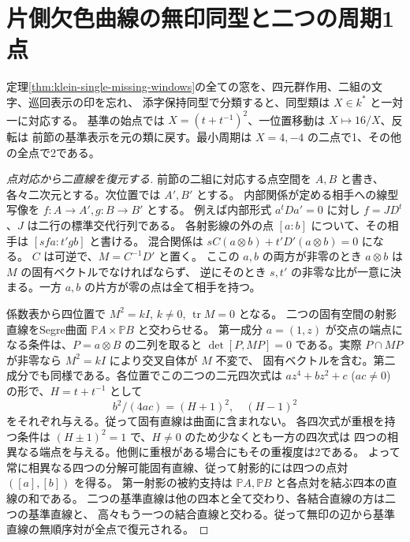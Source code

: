 \section{片側欠色曲線の無印同型と二つの周期1点}
\label{sec:single-missing-curve-isomorphism}
\begin{theorem}\label{thm:single-missing-curve-isomorphism}
定理\ref{thm:klein-single-missing-windows}の全ての窓を、四元群作用、二組の文字、巡回表示の印を忘れ、
添字保持同型で分類すると、同型類は $X\in k^*$ と一対一に対応する。
基準の始点では $X=(t+t^{-1})^2$、一位置移動は $X\mapsto16/X$、反転は
前節の基準表示を元の類に戻す。最小周期は $X=4,-4$ の二点で1、その他の全点で2である。
\end{theorem}
\begin{proof}[点対応から二直線を復元する]
前節の二組に対応する点空間を $A,B$ と書き、各々二次元とする。次位置では $A',B'$ とする。
内部関係が定める相手への線型写像を $f:A\to A',g:B\to B'$ とする。
例えば内部形式 $a^t D a'=0$ に対し $f=JD^t$、$J$ は二行の標準交代行列である。
各射影線の外の点 $[a:b]$ について、その相手は $[sfa:t'gb]$ と書ける。
混合関係は $s C(a\otimes b)+t' D'(a\otimes b)=0$ になる。
$C$ は可逆で、$M=C^{-1}D'$ と置く。
ここの $a,b$ の両方が非零のとき $a\otimes b$ は $M$ の固有ベクトルでなければならず、
逆にそのとき $s,t'$ の非零な比が一意に決まる。一方 $a,b$ の片方が零の点は全て相手を持つ。

係数表から四位置で $M^2=kI$, $k\ne0$, $\operatorname{tr} M=0$ となる。
二つの固有空間の射影直線をSegre曲面 $\mathbb P A\times\mathbb P B$ と交わらせる。
第一成分 $a=(1,z)$ が交点の端点になる条件は、$P=a\otimes B$ の二列を取ると
$\det[P,MP]=0$ である。実際 $P\cap MP$ が非零なら $M^2=kI$ により交叉自体が $M$ 不変で、
固有ベクトルを含む。第二成分でも同様である。各位置でこの二つの二元四次式は
$az^4+bz^2+c$ ($ac\ne0$) の形で、$H=t+t^{-1}$ として
\[
       b^2/(4ac)=(H+1)^2,\quad (H-1)^2
\]
をそれぞれ与える。従って固有直線は曲面に含まれない。
各四次式が重根を持つ条件は $(H\pm1)^2=1$ で、$H\ne0$ のため少なくとも一方の四次式は
四つの相異なる端点を与える。他側に重根がある場合にもその重複度は2である。
よって常に相異なる四つの分解可能固有直線、従って射影的には四つの点対 $([a],[b])$ を得る。
第一射影の被約支持は $\mathbb P A,\mathbb P B$ と各点対を結ぶ四本の直線の和である。
二つの基準直線は他の四本と全て交わり、各結合直線の方は二つの基準直線と、
高々もう一つの結合直線と交わる。従って無印の辺から基準直線の無順序対が全点で復元される。
\end{proof}

